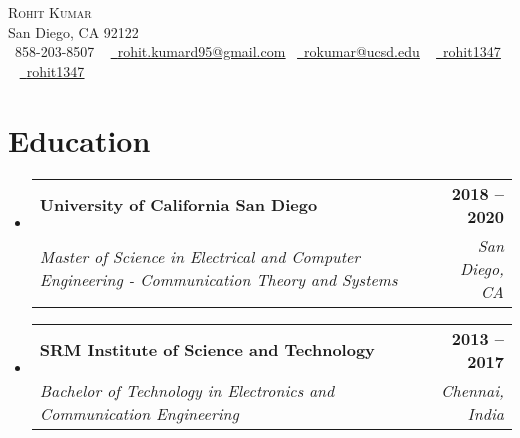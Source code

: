 \documentclass[letterpaper,11pt]{article}
\makeatletter
\newcommand{\resumeSubheading}[4]{
  \vspace{-2pt}\item
    \begin{tabular*}{1.0\textwidth}[t]{l@{\extracolsep{\fill}}r}
      \textbf{#1} & \textbf{\small #2} \\
      \textit{\small#3} & \textit{\small #4} \\
    \end{tabular*}\vspace{-7pt}
}
\newcommand{\resumeSubHeadingListStart}{\begin{itemize}[leftmargin=0.0in, label={}]}
\newcommand{\resumeSubHeadingListEnd}{\end{itemize}}
\makeatother
\begin{document}

\begin{center}
    {\Huge \scshape Rohit Kumar} \\ \vspace{1pt}
    San Diego, CA 92122 \\ \vspace{1pt}
    \small \raisebox{-0.1\height}\faPhone\ 858-203-8507 ~ \href{mailto:rohit.kumard95@gmail.com}{\raisebox{-0.2\height}\faEnvelope\  \underline{rohit.kumard95@gmail.com}} ~\href{mailto:rokumar@ucsd.edu}{\raisebox{-0.2\height}\faEnvelope\  \underline{rokumar@ucsd.edu}} ~ 
    \href{https://www.linkedin.com/in/rohit1347/}{\raisebox{-0.2\height}\faLinkedin\ \underline{rohit1347}}  ~
    \href{https://github.com/rohit1347}{\raisebox{-0.2\height}\faGithub\ \underline{rohit1347}}
    \vspace{-8pt}
\end{center}


\section{Education}
  \resumeSubHeadingListStart
    \resumeSubheading
      {University of California San Diego}{2018 -- 2020}
      {Master of Science in Electrical and Computer Engineering - Communication Theory and Systems}{San Diego, CA}
       \resumeSubheading
      {SRM Institute of Science and Technology}{2013 -- 2017}
      {Bachelor of Technology in Electronics and Communication Engineering}{Chennai, India}
  \resumeSubHeadingListEnd

\end{document}
